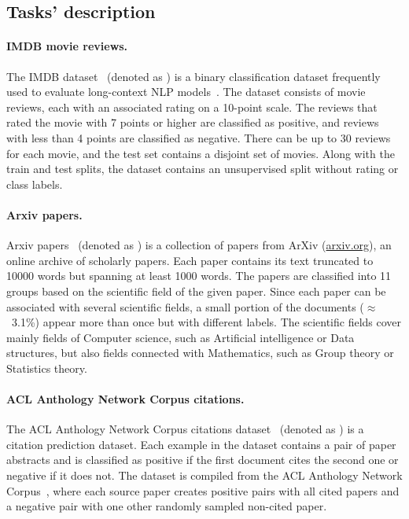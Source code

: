 \subsection{Tasks' description}

\paragraph{IMDB movie reviews.} The IMDB dataset~\citep{maas2011learning}
(denoted as ) is a binary classification dataset frequently used to
evaluate long-context NLP models~\citep{zaheer2020big, beltagy2020longformer,
le2014distributed}. The dataset consists of movie reviews, each with an
associated rating on a 10-point scale. The reviews that rated the movie with 7
points or higher are classified as positive, and reviews with less than 4
points are classified as negative. There can be up to 30 reviews for each
movie, and the test set contains a disjoint set of movies. Along with the train
and test splits, the dataset contains an unsupervised split without rating or
class labels.

\paragraph{Arxiv papers.} Arxiv papers~\citep{arxiv_papers} (denoted as
) is a collection of papers from ArXiv (\url{arxiv.org}),
an online archive of scholarly papers. Each paper contains its text truncated
to 10000 words but spanning at least 1000 words. The papers are classified into
11 groups based on the scientific field of the given paper. Since each paper
can be associated with several scientific fields, a small portion of the
documents ($\approx$~3.1\%) appear more than once but with different labels.
The scientific fields cover mainly fields of Computer science, such as
Artificial intelligence or Data structures, but also fields connected with
Mathematics, such as Group theory or Statistics theory.

\paragraph{ACL Anthology Network Corpus citations.} The ACL Anthology Network
Corpus citations dataset~\citep{zhou2020multilevel} (denoted as ) is
a citation prediction dataset. Each example in the dataset contains a pair of
paper abstracts and is classified as positive if the first document cites the
second one or negative if it does not. The dataset is compiled from the ACL
Anthology Network Corpus~\citep{radev2013acl}, where each source paper creates
positive pairs with all cited papers and a negative pair with one other randomly
sampled non-cited paper.

